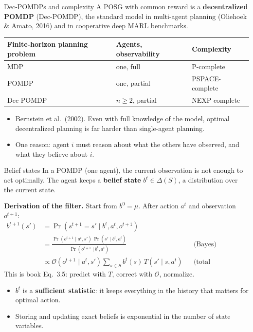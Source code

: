\documentclass[aspectratio=169,11pt]{beamer}
\begin{document}
\begin{frame}{Dec-POMDPs and complexity}
  A POSG with common reward is a \textbf{decentralized POMDP} (Dec-POMDP), the standard model in multi-agent planning (Oliehoek \& Amato, 2016) and in cooperative deep MARL benchmarks.
  \bigskip

  \begin{center}
    \begin{tabular}{lll}
      \toprule
      Finite-horizon planning problem & Agents, observability & Complexity \\
      \midrule
      MDP & one, full & P-complete \\
      POMDP & one, partial & PSPACE-complete \\
      Dec-POMDP & $n \ge 2$, partial & NEXP-complete \\
      \bottomrule
    \end{tabular}
  \end{center}
  \begin{itemize}
    \item Bernstein et al.\ (2002). Even with full knowledge of the model, optimal decentralized planning is far harder than single-agent planning.
    \item One reason: agent $i$ must reason about what the others have observed, and what they believe about $i$.
  \end{itemize}
\end{frame}

\begin{frame}{Belief states}
  In a POMDP (one agent), the current observation is not enough to act optimally. The agent keeps a \textbf{belief state} $b^t \in \Delta(S)$, a distribution over the current state.
  \bigskip

  \textbf{Derivation of the filter.} Start from $b^0 = \mu$. After action $a^t$ and observation $o^{t+1}$:
  \begin{align*}
    b^{t+1}(s') &= \Pr(s^{t+1} = s' \mid b^t, a^t, o^{t+1}) \\
    &= \frac{\Pr(o^{t+1} \mid a^t, s')\, \Pr(s' \mid b^t, a^t)}{\Pr(o^{t+1} \mid b^t, a^t)} && \text{(Bayes)} \\
    &\propto \mathcal{O}(o^{t+1} \mid a^t, s') \sum_{s \in S} b^t(s)\, T(s' \mid s, a^t) && \text{(total probability)}
  \end{align*}
  This is book Eq.\ 3.5: predict with $T$, correct with $\mathcal{O}$, normalize.
  \begin{itemize}
    \item $b^t$ is a \textbf{sufficient statistic}: it keeps everything in the history that matters for optimal action.
    \item Storing and updating exact beliefs is exponential in the number of state variables.
  \end{itemize}
\end{frame}
\end{document}
